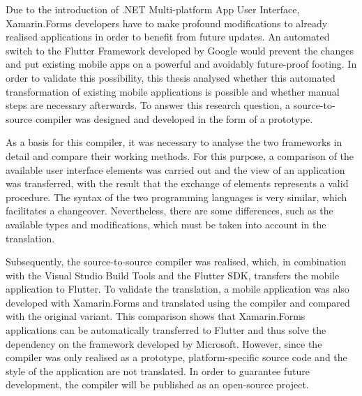 Due to the introduction of .NET Multi-platform App User Interface,  Xamarin.Forms developers have to make profound modifications to already realised applications in order to benefit from future updates.  An automated switch to the Flutter Framework developed by Google would prevent the changes and put existing mobile apps on a powerful and avoidably future-proof footing.  In order to validate this possibility, this thesis analysed whether this automated transformation of existing mobile applications is possible and whether manual steps are necessary afterwards.  To answer this research question, a source-to-source compiler was designed and developed in the form of a prototype.  

As a basis for this compiler, it was necessary to analyse the two frameworks in detail and compare their working methods.  For this purpose, a comparison of the available user interface elements was carried out and the view of an application was transferred, with the result that the exchange of elements represents a valid procedure.  The syntax of the two programming languages is very similar, which facilitates a changeover. Nevertheless, there are some differences, such as the available types and modifications, which must be taken into account in the translation.  

Subsequently, the source-to-source compiler was realised, which, in combination with the Visual Studio Build Tools and the Flutter SDK, transfers the mobile application to Flutter. To validate the translation, a mobile application was also developed with Xamarin.Forms and translated using the compiler and compared with the original variant.  
This comparison shows that Xamarin.Forms applications can be automatically transferred to Flutter and thus solve the dependency on the framework developed by Microsoft.  However, since the compiler was only realised as a prototype, platform-specific source code and the style of the application are not translated.  In order to guarantee future development, the compiler will be published as an open-source project. 

